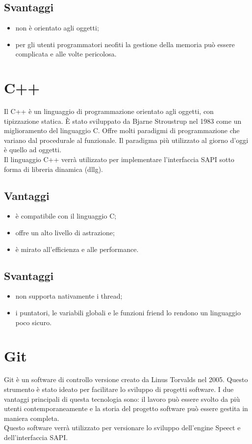 \subsection*{Svantaggi}
\begin{itemize}
	\item non è orientato agli oggetti;
	\item per gli utenti programmatori neofiti la gestione della memoria può essere complicata e alle volte pericolosa.
\end{itemize}
\section{C++}
Il C++ è un linguaggio di programmazione orientato agli oggetti, con tipizzazione statica. È stato sviluppato da Bjarne Stroustrup nel 1983 come un miglioramento del linguaggio C.
Offre molti paradigmi di programmazione che variano dal procedurale al funzionale.
Il paradigma più utilizzato al giorno d'oggi è quello ad oggetti.\\
Il linguaggio C++ verrà utilizzato per implementare l'interfaccia SAPI sotto forma di libreria dinamica (\gls{dllg}).
\subsection*{Vantaggi}
\begin{itemize}
	\item è compatibile con il linguaggio C;
	\item offre un alto livello di astrazione;
	\item è mirato all'efficienza e alle performance.
\end{itemize}
\subsection*{Svantaggi}
\begin{itemize}
	\item non supporta nativamente i thread;
	\item i puntatori, le variabili globali e le funzioni friend lo rendono un linguaggio poco sicuro.
\end{itemize}
\section{Git}
Git è un software di controllo versione creato da Linus Torvalds nel 2005. Questo strumento è stato ideato per facilitare lo sviluppo di progetti software. I due vantaggi principali di questa tecnologia sono: il lavoro può essere svolto da più utenti contemporaneamente e la storia del progetto software può essere gestita in maniera completa.\\
Questo software verrà utilizzato per versionare lo sviluppo dell'engine Speect e dell'interfaccia SAPI.

